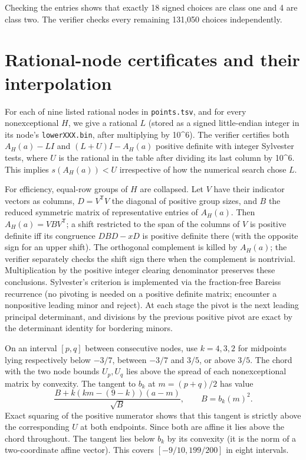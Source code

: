 \documentclass[11pt]{article}
\begin{document}
Checking the entries shows that exactly 18 signed choices are class one and 4 are class two. The verifier checks every remaining 131,050 choices independently.

\section{Rational-node certificates and their interpolation}\label{rational-node-certificates-and-their-interpolation}

For each of nine listed rational nodes in \texttt{points.tsv}, and for every nonexceptional \(H\), we give a rational \(L\) (stored as a signed little-endian integer in its node's \texttt{lowerXXX.bin}, after multiplying by 10\^{}6). The verifier certifies both \(A_H(a)-LI\) and \((L+U)I-A_H(a)\) positive definite with integer Sylvester tests, where \(U\) is the rational in the table after dividing its last column by 10\^{}6. This implies \(s(A_H(a))<U\) irrespective of how the numerical search chose \(L\).

For efficiency, equal-row groups of \(H\) are collapsed. Let \(V\) have their indicator vectors as columns, \(D=V^{\mathsf T} V\) the diagonal of positive group sizes, and \(B\) the reduced symmetric matrix of representative entries of \(A_H(a)\). Then \(A_H(a)=VBV^{\mathsf T}\); a shift restricted to the span of the columns of \(V\) is positive definite iff its congruence \(DBD-xD\) is positive definite there (with the opposite sign for an upper shift). The orthogonal complement is killed by \(A_H(a)\); the verifier separately checks the shift sign there when the complement is nontrivial. Multiplication by the positive integer clearing denominator preserves these conclusions. Sylvester's criterion is implemented via the fraction-free Bareiss recurrence (no pivoting is needed on a positive definite matrix; encounter a nonpositive leading minor and reject). At each stage the pivot is the next leading principal determinant, and divisions by the previous positive pivot are exact by the determinant identity for bordering minors.

On an interval \([p,q]\) between consecutive nodes, use \(k=4,3,2\) for midpoints lying respectively below \(-3/7\), between \(-3/7\) and \(3/5\), or above \(3/5\). The chord with the two node bounds \(U_p,U_q\) lies above the spread of each nonexceptional matrix by convexity. The tangent to \(b_k\) at \(m=(p+q)/2\) has value
\[
\frac{B+k(km-(9-k))(a-m)}{\sqrt B},\qquad B=b_k(m)^2.
\]
Exact squaring of the positive numerator shows that this tangent is strictly above the corresponding \(U\) at both endpoints. Since both are affine it lies above the chord throughout. The tangent lies below \(b_k\) by its convexity (it is the norm of a two-coordinate affine vector). This covers \([-9/10,199/200]\) in eight intervals.
\end{document}
